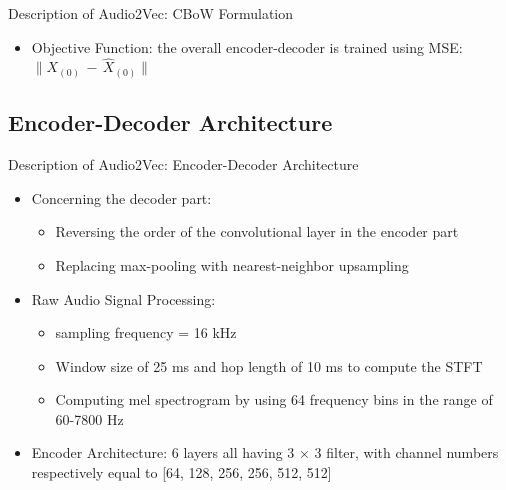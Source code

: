 \documentclass{Beamer}
\begin{document}
\begin{frame}[t,allowframebreaks]{Description of Audio2Vec: CBoW Formulation}
\begin{itemize}
	\begin{itemize}
	\item Concatenating $\bar{z}_{(0)} \, = \, \left[ \, z_{(-P)} \, , \, \cdots \, , \, z_{(-1)} \, , \, z_{(1)} \, , \, \cdots \, ,\, z_{(P)}   \,\right]$
	
	\item Decoder: $ \hat{X}_{(0)} \, = \, Dec(\bar{z}_{(0)})$
	\end{itemize}

\item Objective Function: the overall encoder-decoder is trained using MSE: $\parallel X_{(0)} \, - \,  \hat{X}_{(0)} \parallel$

\end{itemize}

\end{frame}

\subsection{Encoder-Decoder Architecture}
\begin{frame}[t,allowframebreaks]{Description of Audio2Vec: Encoder-Decoder Architecture}

\begin{itemize}

\item Concerning the decoder part:

	\begin{itemize}
	\item Reversing the order of the convolutional layer in the encoder part
	
	\item Replacing max-pooling with nearest-neighbor upsampling
	\end{itemize}


\item Raw Audio Signal Processing:
	
	\begin{itemize}
	\item sampling frequency = 16 kHz
	
	\item Window size of 25 ms and hop length of 10 ms to compute the STFT 
	
	\item Computing  mel spectrogram by using 64 frequency bins in the range of 60-7800 Hz 	 	
	
	
	\end{itemize}


\item Encoder Architecture: 6 layers all having $3 \, \times \, 3$ filter, with channel numbers respectively equal to [64, 128, 256, 256, 512, 512]

\end{itemize} 

\end{frame}
\end{document}
